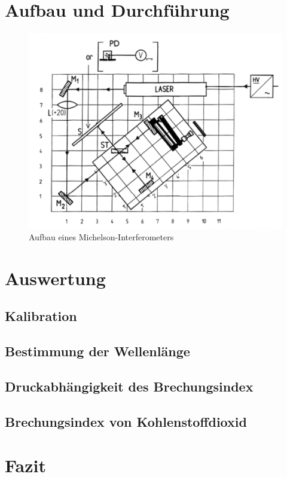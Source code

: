 \documentclass[12pt,a4paper]{article}
\begin{document}
\section{Aufbau und Durchführung}
\begin{figure}
\centering
\includegraphics[scale=0.6]{Bilder/Aufbau}
\caption{Aufbau eines Michelson-Interferometers}
\label{fig:Aufbau}
\end{figure}


\section{Auswertung}

\subsection{Kalibration}

\subsection{Bestimmung der Wellenlänge}

\subsection{Druckabhängigkeit des Brechungsindex}

\subsection{Brechungsindex von Kohlenstoffdioxid}

\section{Fazit}
\end{document}
